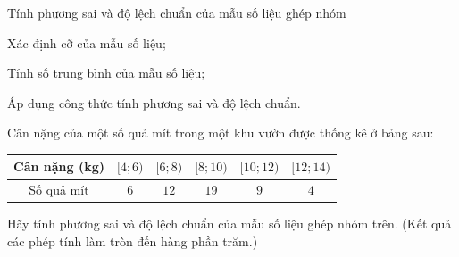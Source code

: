 \begin{dang}{Tính phương sai và độ lệch chuẩn của mẫu số liệu ghép nhóm}
\begin{listEX}[1]
	\item [\ding{172}] Xác định cỡ của mẫu số liệu;
	\item [\ding{173}] Tính số trung bình của mẫu số liệu;
	\item [\ding{174}] Áp dụng công thức tính phương sai và độ lệch chuẩn.
\end{listEX}
\end{dang}
\setcounter{vd}{0}
\setcounter{ex}{0}
	\begin{vd}
		Cân nặng của một số quả mít trong một khu vườn được thống kê ở bảng sau:
			\begin{center}
			\begin{tabular}{|c|c|c|c|c|c|}
			\hline Cân nặng (kg) &{$[4; 6)$} &{$[6; 8)$} &{$[8; 10)$} &{$[10; 12)$} &{$[12; 14)$} \\
			\hline Số quả mít & $ 6 $ & $ 12 $ & $ 19 $ & $ 9 $ & $ 4 $ \\
			\hline
			\end{tabular}
			\end{center}
		Hãy tính phương sai và độ lệch chuẩn của mẫu số liệu ghép nhóm trên. (Kết quả các phép tính làm tròn đến hàng phần trăm.)
\end{vd}
